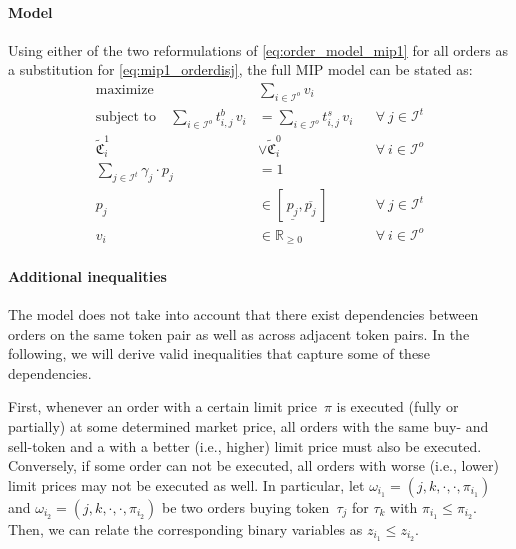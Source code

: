 \documentclass[11pt,parskip=full]{scrartcl}%
\newcommand*{\ie}{i.e., }
\newcommand*{\itokens}{\mathcal{I}^t}       %
\newcommand*{\iorders}{\mathcal{I}^o}       %
\begin{document}
\paragraph{Model}

Using either of the two reformulations of \eqref{eq:order_model_mip1} for all orders as a
substitution for \eqref{eq:mip1_orderdisj}, the full MIP model can be stated as:
\begin{subequations}
\begin{align}
  \text{maximize} \quad & \sum\limits_{i \in \iorders} v_i
  \label{eq:mip1_objective}
  \\[2mm]
  \text{subject to} \quad
  \sum\limits_{i \in \iorders} t^b_{i,j} \, v_i
  &= \sum\limits_{i \in \iorders} t^s_{i,j} \, v_i
  && \forall \> j \in \itokens
  \label{eq:mip1_tokenbalance}
  \\[4mm]
  \tilde{\mathfrak{C}}^1_i &\lor \tilde{\mathfrak{C}}^0_i
  && \forall \> i \in \iorders
  \label{eq:mip1_orderdisj} 
  \\[2mm]
  \sum\limits_{j \in \itokens} \gamma_j \cdot p_j
  &= 1
  \label{eq:mip1_reftoken}
  \\[1mm]
  p_j
  &\in [\,\underline{p_j},\overline{p_j}\,]
  && \forall \> j \in \itokens
  \\[1mm]
  v_i
  &\in \mathbb{R}_{\ge 0}
  && \forall \> i \in \iorders
\end{align}
\label{eq:mip1}
\end{subequations}

\vspace{-.5cm}
\paragraph{Additional inequalities}

The model does not take into account that there exist dependencies between orders on the same token
pair as well as across adjacent token pairs.
In the following, we will derive valid inequalities that capture some of these dependencies.

First, whenever an order with a certain limit price~$\pi$ is executed (fully or partially)
at some determined market price, all orders with the same buy- and sell-token and a with a better 
(\ie higher) limit price must also be executed.
Conversely, if some order can not be executed, all orders with worse (\ie lower) limit prices may
not be executed as well.
In particular, let
$\omega_{i_1} = (j,k,\cdot,\cdot,\pi_{i_1})$ and $\omega_{i_2} = (j,k,\cdot,\cdot,\pi_{i_2})$
be two orders buying token~$\tau_j$ for $\tau_k$ with $\pi_{i_1} \le \pi_{i_2}$.
Then, we can relate the corresponding binary variables as $z_{i_1} \le z_{i_2}$.
\end{document}
